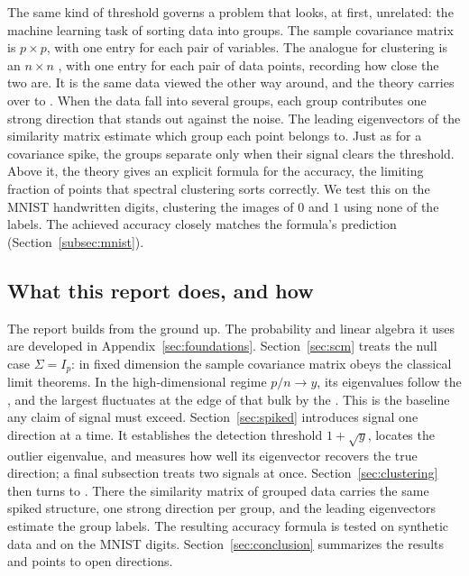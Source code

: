 The same kind of threshold governs a problem that looks, at first, unrelated: the machine learning task of sorting data into groups. The sample covariance matrix is \(p \times p\), with one entry for each pair of variables. The analogue for clustering is an \(n \times n\) , with one entry for each pair of data points, recording how close the two are. It is the same data viewed the other way around, and the theory carries over to  \citep{vonLuxburg2007, NgJordanWeiss2002}. When the data fall into several groups, each group contributes one strong direction that stands out against the noise. The leading eigenvectors of the similarity matrix estimate which group each point belongs to. Just as for a covariance spike, the groups separate only when their signal clears the threshold. Above it, the theory gives an explicit formula for the accuracy, the limiting fraction of points that spectral clustering sorts correctly. We test this on the MNIST handwritten digits, clustering the images of \(0\) and \(1\) using none of the labels. The achieved accuracy closely matches the formula's prediction (Section~\ref{subsec:mnist}).

\subsection*{What this report does, and how}

The report builds from the ground up. The probability and linear algebra it uses are developed in Appendix~\ref{sec:foundations}. Section~\ref{sec:scm} treats the null case \(\Sigma = I_p\): in fixed dimension the sample covariance matrix obeys the classical limit theorems. In the high-dimensional regime \(p/n \to y\), its eigenvalues follow the  \citep{MarchenkoPastur1967}, and the largest fluctuates at the edge of that bulk by the  \citep{TracyWidom1996, Johnstone2001}. This is the baseline any claim of signal must exceed. Section~\ref{sec:spiked} introduces signal one direction at a time. It establishes the detection threshold \(1 + \sqrt{y}\), locates the outlier eigenvalue, and measures how well its eigenvector recovers the true direction; a final subsection treats two signals at once. Section~\ref{sec:clustering} then turns to . There the similarity matrix of grouped data carries the same spiked structure, one strong direction per group, and the leading eigenvectors estimate the group labels. The resulting accuracy formula is tested on synthetic data and on the MNIST digits. Section~\ref{sec:conclusion} summarizes the results and points to open directions.


